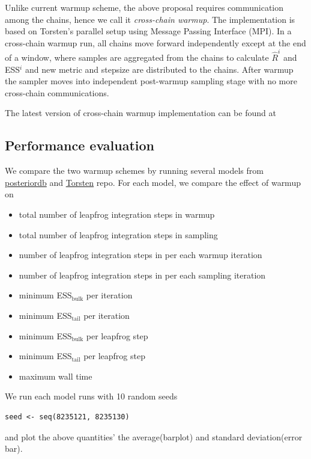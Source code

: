 \documentclass[11pt, reqno, oneside]{amsart}
\begin{document}
Unlike current warmup scheme, the above proposal requires
communication among the chains, hence we call it \emph{cross-chain warmup}.
The implementation is based on Torsten's parallel setup using Message
Passing Interface (MPI). In
a cross-chain warmup run, all chains move forward independently except
at the end of a window, where samples are aggregated from the chains
to calculate \(\hat{R}^i\) and ESS\(^i\) and new metric and stepsize are
distributed to the chains.
After warmup the sampler moves into independent post-warmup sampling stage
with no more cross-chain communications.

The latest version of cross-chain warmup implementation can be found
at

\subsection{Performance evaluation}
\label{sec:org23ace1a}
We compare the two warmup schemes by running several models
from \href{https://github.com/MansMeg/posteriordb}{posteriordb} and \href{https://github.com/metrumresearchgroup/Torsten/tree/master/example-models}{Torsten} repo. For each model, we compare the
effect of warmup on 
\begin{itemize}
\item total number of leapfrog integration steps in warmup
\item total number of leapfrog integration steps in sampling
\item number of leapfrog integration steps in per each warmup iteration
\item number of leapfrog integration steps in per each sampling iteration
\item minimum ESS\(_{\text{bulk}}\) per iteration
\item minimum ESS\(_{\text{tail}}\) per iteration
\item minimum ESS\(_{\text{bulk}}\) per leapfrog step
\item minimum ESS\(_{\text{tail}}\) per leapfrog step
\item maximum wall time
\end{itemize}

We run each model runs with 10 random seeds 
\begin{verbatim}
seed <- seq(8235121, 8235130)
\end{verbatim}
and plot the above
quantities' the average(barplot)
and standard deviation(error bar).
\end{document}
